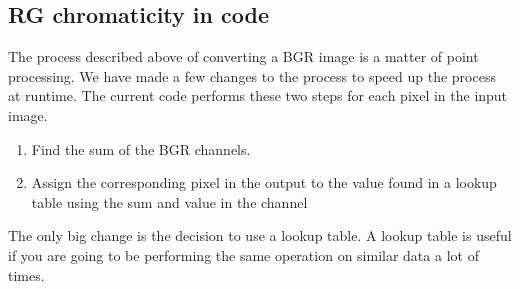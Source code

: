 \subsection{RG chromaticity in code}
The process described above of converting a BGR image is a matter of point processing. We have made a few changes to the process to speed up the process at runtime. The current code performs these two steps for	 each pixel in the input image.\\
\begin{enumerate}
	\item Find the sum of the BGR channels.
	\item Assign the corresponding pixel in the output to the value found in a lookup table using the sum and value in the channel\\
\end{enumerate}
The only big change is the decision to use a lookup table. A lookup table is useful if you are going to be performing the same operation on similar data a lot of times. 
